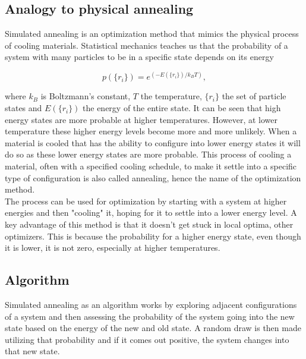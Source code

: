 \subsection{Analogy to physical annealing}

Simulated annealing is an optimization method that mimics the
physical process of cooling materials\autocite{simulated_annealing}.
Statistical mechanics teaches us that the probability of a system with
many particles to be in a specific state depends on its energy

\begin{equation}
    p(\{r_i\}) = e^{(-E(\{r_i\})/k_B T)},
\end{equation}

where $k_B$ is Boltzmann's constant, $T$ the temperature, $\{r_i\}$
the set of particle states and $E(\{r_i\})$ the energy of the entire state.
It can be seen that high energy states are more probable at higher temperatures.
However, at lower temperature these higher energy levels become more and more
unlikely. When a material is cooled
that has the ability to configure
into lower energy states it will do so as these lower energy states
are more probable. This process of cooling a material, often with a
specified cooling schedule, to make it settle into a specific type of configuration
is also called annealing, hence the name of the optimization method.\\
The process can be used for optimization by starting with a system at higher
energies and then "cooling" it, hoping for it to settle into a lower energy level.
A key advantage of this method is that it doesn't get stuck in local optima, 
other optimizers. This is because the probability for a higher energy state,
even though it is lower, it is not zero, especially at higher temperatures.



\subsection{Algorithm}

Simulated annealing as an algorithm works by exploring adjacent
configurations of a system and then assessing the probability of
the system going into the new state based on the energy
of the new and old state. A random draw is then made
utilizing that probability and if it comes out positive, the system
changes into that new state. 

